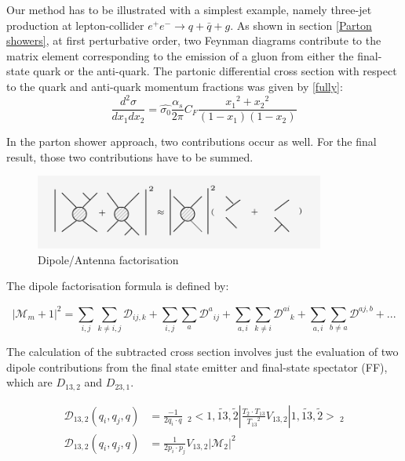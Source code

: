 Our method has to be illustrated with a simplest example, namely three-jet production at lepton-collider $ e^+ e^- \rightarrow q + \bar{q} + g $. As shown in section \ref{Parton showers}, at first perturbative order, two Feynman diagrams contribute to the matrix element corresponding to the emission of a gluon from either the final-state quark or the anti-quark. The partonic differential cross section with respect to the quark and anti-quark momentum fractions was given by \ref{fully}:
\begin{equation}
\frac{d^2 \sigma}{dx_1 dx_2}= \hat{\sigma_0}
\frac{\alpha_s}{2\pi} C_F \frac{{x_1}^2+{x_2}^2}{(1-x_1)(1-x_2)}
\label{confi}
\end{equation}

In the parton shower approach, two contributions occur as well. For the final result, those two contributions have to be summed. 

\begin{figure}[h!]
\centering
\includegraphics[width=0.85\textwidth]{images/Intro/factorization.png}
\caption{Dipole/Antenna factorisation}
\end{figure}


The dipole factorisation formula is defined by:

 \begin{equation}
 |\mathcal{M}_m+1|^2 = \displaystyle\sum\limits_{i,j} \displaystyle\sum\limits_{k\neq i,j} \mathcal{D}_{ij,k} +\displaystyle\sum\limits_{i,j} \displaystyle\sum\limits_{a} {\mathcal{D}^a}_{ij}+\displaystyle\sum\limits_{a,i} \displaystyle\sum\limits_{k\neq i} {\mathcal{D}^{ai}}_{k}+\displaystyle\sum\limits_{a,i} \displaystyle\sum\limits_{b\neq a} \mathcal{D}^{aj,b}+...
 \end{equation}
 
The calculation of the subtracted cross section involves just the evaluation of two dipole contributions from the final state emitter and final-state spectator (FF), which are $ D_{13,2} $ and $ D_{23,1} $. 

\begin{equation}
\begin{split}
\mathcal{D}_{13,2} (q_i,q_j,q)&= \frac{-1}{2q_i \cdot q} \:\:_2<1,\tilde{13},\tilde{2} |\frac{T_2 \cdot T_{13}}{{T_{13}}^2} V_{13,2}| 1,\tilde{13},\tilde{2} >\:_2\\
\mathcal{D}_{13,2} (q_i,q_j,q)&=\frac{1}{2p_i \cdot p_j} V_{13,2} |\mathcal{M}_{2}|^2
\end{split}
\end{equation}



